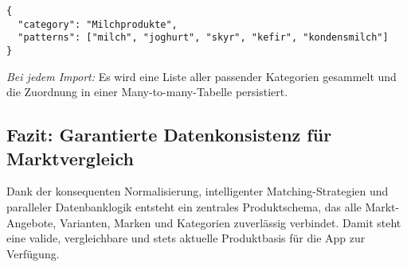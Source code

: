 \begin{lstlisting}[style=typescriptstyle, caption={Beispielstruktur: Kategorie-Definitionen als JSON}]
{
  "category": "Milchprodukte",
  "patterns": ["milch", "joghurt", "skyr", "kefir", "kondensmilch"]
}
\end{lstlisting}

\emph{Bei jedem Import:} Es wird eine Liste aller passender Kategorien gesammelt und die Zuordnung in einer Many-to-many-Tabelle persistiert.

\subsection{Fazit: Garantierte Datenkonsistenz für Marktvergleich}

Dank der konsequenten Normalisierung, intelligenter Matching-Strategien und paralleler Datenbanklogik entsteht ein zentrales Produktschema, das alle Markt-Angebote, Varianten, Marken und Kategorien zuverlässig verbindet. Damit steht eine valide, vergleichbare und stets aktuelle Produktbasis für die App zur Verfügung.

\cleardoublepage

